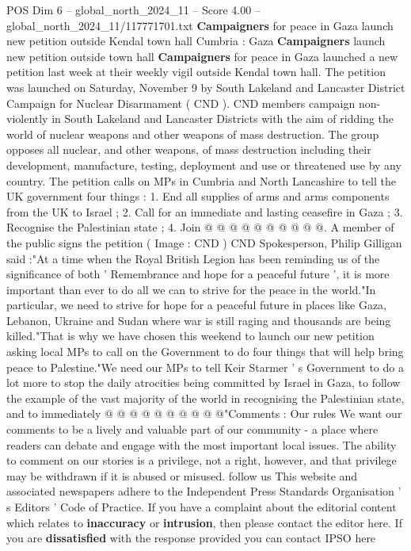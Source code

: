 \begin{textsample}{POS Dim 6 – global\_north\_2024\_11 – Score 4.00 – global\_north\_2024\_11/117771701.txt}  \label{ex:f6_pos_287}
\textbf{Campaigners} for peace in Gaza launch new petition outside Kendal town hall Cumbria : Gaza \textbf{Campaigners} launch new petition outside town hall \textbf{Campaigners} for peace in Gaza launched a new petition last week at their weekly vigil outside Kendal town hall.
The petition was launched on Saturday, November 9 by South Lakeland and Lancaster District Campaign for Nuclear Disarmament ( CND ).
CND members campaign non-violently in South Lakeland and Lancaster Districts with the aim of ridding the world of nuclear weapons and other weapons of mass destruction.
The group opposes all nuclear, and other weapons, of mass destruction including their development, manufacture, testing, deployment and use or threatened use by any country.
The petition calls on MPs in Cumbria and North Lancashire to tell the UK government four things : 1.
End all supplies of arms and arms components from the UK to Israel ; 2.
Call for an immediate and lasting ceasefire in Gaza ; 3.
Recognise the Palestinian state ; 4.
Join @ @ @ @ @ @ @ @ @ @.
A member of the public signs the petition ( Image : CND ) CND Spokesperson, Philip Gilligan said :"At a time when the Royal British Legion has been reminding us of the significance of both ' Remembrance and hope for a peaceful future ', it is more important than ever to do all we can to strive for the peace in the world."In particular, we need to strive for hope for a peaceful future in places like Gaza, Lebanon, Ukraine and Sudan where war is still raging and thousands are being killed."That is why we have chosen this weekend to launch our new petition asking local MPs to call on the Government to do four things that will help bring peace to Palestine."We need our MPs to tell Keir Starmer ' s Government to do a lot more to stop the daily atrocities being committed by Israel in Gaza, to follow the example of the vast majority of the world in recognising the Palestinian state, and to immediately @ @ @ @ @ @ @ @ @ @"Comments : Our rules We want our comments to be a lively and valuable part of our community - a place where readers can debate and engage with the most important local issues.
The ability to comment on our stories is a privilege, not a right, however, and that privilege may be withdrawn if it is abused or misused. follow us This website and associated newspapers adhere to the Independent Press Standards Organisation ' s Editors ' Code of Practice.
If you have a complaint about the editorial content which relates to \textbf{inaccuracy} or \textbf{intrusion}, then please contact the editor here.
If you are \textbf{dissatisfied} with the response provided you can contact IPSO here

\end{textsample}
